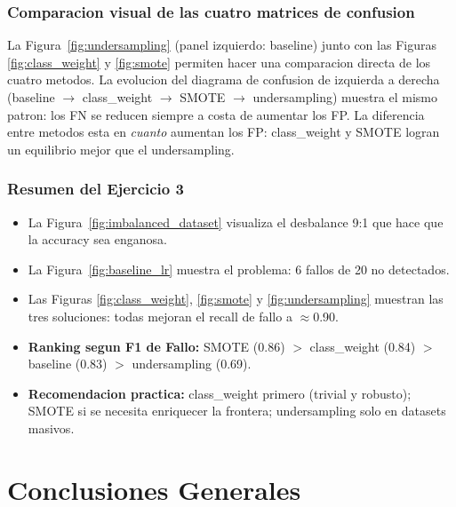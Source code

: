\documentclass[12pt,a4paper]{article}
\begin{document}
\subsubsection*{Comparacion visual de las cuatro matrices de confusion}

La Figura~\ref{fig:undersampling} (panel izquierdo: baseline) junto con las Figuras
\ref{fig:class_weight} y \ref{fig:smote} permiten hacer una comparacion directa de los cuatro
metodos. La evolucion del diagrama de confusion de izquierda a derecha (baseline $\to$
class\_weight $\to$ SMOTE $\to$ undersampling) muestra el mismo patron: los FN se reducen
siempre a costa de aumentar los FP. La diferencia entre metodos esta en \textit{cuanto} aumentan
los FP: class\_weight y SMOTE logran un equilibrio mejor que el undersampling.

\subsubsection*{Resumen del Ejercicio 3}

\begin{tcolorbox}[resultbox, title={Conclusiones Ejercicio 3 -- Datos Desbalanceados}]
  \begin{itemize}
    \item La Figura~\ref{fig:imbalanced_dataset} visualiza el desbalance 9:1 que hace que
      la accuracy sea enganosa.
    \item La Figura~\ref{fig:baseline_lr} muestra el problema: 6 fallos de 20 no detectados.
    \item Las Figuras \ref{fig:class_weight}, \ref{fig:smote} y \ref{fig:undersampling} muestran
      las tres soluciones: todas mejoran el recall de fallo a $\approx$0.90.
    \item \textbf{Ranking segun F1 de Fallo:} SMOTE (0.86) $>$ class\_weight (0.84) $>$
      baseline (0.83) $>$ undersampling (0.69).
    \item \textbf{Recomendacion practica:} class\_weight primero (trivial y robusto); SMOTE
      si se necesita enriquecer la frontera; undersampling solo en datasets masivos.
  \end{itemize}
\end{tcolorbox}

\newpage

\section{Conclusiones Generales}
\end{document}
